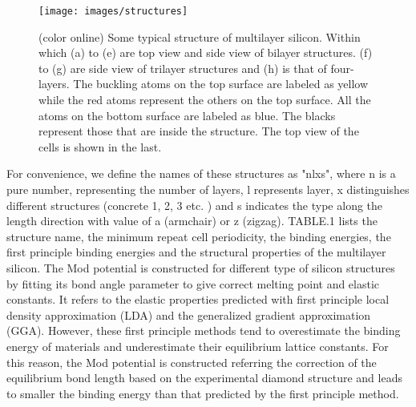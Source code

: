 \documentclass[%
 reprint,
 amsmath,amssymb,
 aps,
prb,
]{revtex4-1}
\begin{document}
\begin{figure}[b]
\texttt{[image: images/structures]}
\caption{\label{fig:structures}  (color online) Some typical structure of multilayer silicon. Within which (a) to (e) are top view and side view of bilayer structures. (f) to (g) are side view of trilayer structures and (h) is that of four-layers. The buckling atoms on the top surface are labeled as yellow while the red atoms represent the others on the top surface. All the atoms on the bottom surface are labeled as blue. The blacks represent those that are inside the structure. The top view of the cells is shown in the last.}
\end{figure}

 For convenience, we define the names of these structures as "nlxs", where n is a pure number, representing the number of layers, l represents layer, x distinguishes different structures (concrete 1, 2, 3 etc. ) and s indicates the type along the length direction with value of a (armchair) or z (zigzag). TABLE.1 lists the structure name, the minimum repeat cell periodicity, the binding energies, the first principle binding energies and the structural properties of the multilayer silicon. The Mod potential is constructed for different type of silicon structures by fitting its bond angle parameter to give correct melting point and elastic constants. It refers to the elastic properties predicted with first principle local density approximation (LDA) and the generalized gradient approximation (GGA). However, these first principle methods tend to overestimate the binding energy of materials and underestimate their equilibrium lattice constants. For this reason, the Mod potential is constructed referring the correction of the equilibrium bond length based on the experimental diamond structure and leads to smaller the binding energy than that predicted by the first principle method.
\end{document}
